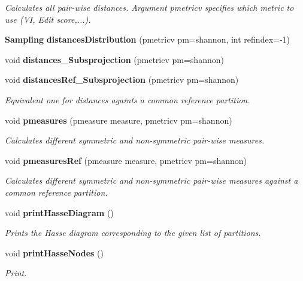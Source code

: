\begin{CompactItemize}
\begin{CompactList}\small\item\em Calculates all pair-wise distances. Argument pmetricv specifies which metric to use (VI, Edit score,...). \item\end{CompactList}\item 
{\bf Sampling} {\bf distances\-Distribution} (pmetricv pm=shannon, int refindex=-1)
\item 
void {\bf distances\_\-Subsprojection} (pmetricv pm=shannon)
\item 
void {\bf distances\-Ref\_\-Subsprojection} (pmetricv pm=shannon)\label{classPartitionStats_a46}

\begin{CompactList}\small\item\em Equivalent one for distances againts a common reference partition. \item\end{CompactList}\item 
void {\bf pmeasures} (pmeasure measure, pmetricv pm=shannon)\label{classPartitionStats_a47}

\begin{CompactList}\small\item\em Calculates different symmetric and non-symmetric pair-wise measures. \item\end{CompactList}\item 
void {\bf pmeasures\-Ref} (pmeasure measure, pmetricv pm=shannon)\label{classPartitionStats_a48}

\begin{CompactList}\small\item\em Calculates different symmetric and non-symmetric pair-wise measures against a common reference partition. \item\end{CompactList}\item 
void {\bf print\-Hasse\-Diagram} ()\label{classPartitionStats_a49}

\begin{CompactList}\small\item\em Prints the Hasse diagram corresponding to the given list of partitions. \item\end{CompactList}\item 
void {\bf print\-Hasse\-Nodes} ()\label{classPartitionStats_a50}

\begin{CompactList}\small\item\em Print. \item\end{CompactList}\end{CompactItemize}
